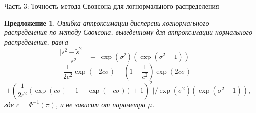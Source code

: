 \documentclass[ucs, notheorems, handout]{beamer}
\newtheorem{proposition2}[theorem]{Предложение}
\begin{document}
	\begin{frame}{Часть 3: Точность метода Свонсона для логнормального распределения}
		\begin{proposition2}\label{pr6}
			Ошибка аппроксимации дисперсии логнормального распределения по методу Свонсона, выведенному для аппроксимации нормального распределения, равна
			\[\dfrac{\mid s^{2} - \widetilde{s}^{2} \mid}{s^{2}} = \biggl|\exp(\sigma^{2})(\exp(\sigma^{2}-1)) -\]\[- \dfrac{1}{2c^{2}}\exp(-2c\sigma)- \left( 1- \dfrac{1}{c^{2}}\right) \exp(2c\sigma)+\]\[+ \left( \dfrac{1}{2c^{2}}(\exp(c\sigma)-1+\exp(-c\sigma)) + 1\right) ^{2}\biggr| /\exp(\sigma^{2})(\exp(\sigma^{2}-1)),\]
			где $c = \Phi^{-1}(\pi)$, и не зависит от параметра $\mu$.
			
			
		\end{proposition2}
		
	\end{frame}
	
\end{document}
